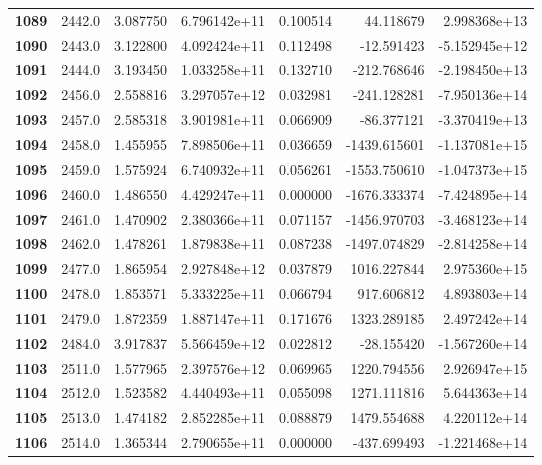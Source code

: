 \documentclass{report}[12pt]
\begin{document}
\begin{center}
\begin{tabular}{lrrrrrr}
\textbf{1089} &         2442.0 &   3.087750 &  6.796142e+11 &    0.100514 &    44.118679 &  2.998368e+13 \\
\textbf{1090} &         2443.0 &   3.122800 &  4.092424e+11 &    0.112498 &   -12.591423 & -5.152945e+12 \\
\textbf{1091} &         2444.0 &   3.193450 &  1.033258e+11 &    0.132710 &  -212.768646 & -2.198450e+13 \\
\textbf{1092} &         2456.0 &   2.558816 &  3.297057e+12 &    0.032981 &  -241.128281 & -7.950136e+14 \\
\textbf{1093} &         2457.0 &   2.585318 &  3.901981e+11 &    0.066909 &   -86.377121 & -3.370419e+13 \\
\textbf{1094} &         2458.0 &   1.455955 &  7.898506e+11 &    0.036659 & -1439.615601 & -1.137081e+15 \\
\textbf{1095} &         2459.0 &   1.575924 &  6.740932e+11 &    0.056261 & -1553.750610 & -1.047373e+15 \\
\textbf{1096} &         2460.0 &   1.486550 &  4.429247e+11 &    0.000000 & -1676.333374 & -7.424895e+14 \\
\textbf{1097} &         2461.0 &   1.470902 &  2.380366e+11 &    0.071157 & -1456.970703 & -3.468123e+14 \\
\textbf{1098} &         2462.0 &   1.478261 &  1.879838e+11 &    0.087238 & -1497.074829 & -2.814258e+14 \\
\textbf{1099} &         2477.0 &   1.865954 &  2.927848e+12 &    0.037879 &  1016.227844 &  2.975360e+15 \\
\textbf{1100} &         2478.0 &   1.853571 &  5.333225e+11 &    0.066794 &   917.606812 &  4.893803e+14 \\
\textbf{1101} &         2479.0 &   1.872359 &  1.887147e+11 &    0.171676 &  1323.289185 &  2.497242e+14 \\
\textbf{1102} &         2484.0 &   3.917837 &  5.566459e+12 &    0.022812 &   -28.155420 & -1.567260e+14 \\
\textbf{1103} &         2511.0 &   1.577965 &  2.397576e+12 &    0.069965 &  1220.794556 &  2.926947e+15 \\
\textbf{1104} &         2512.0 &   1.523582 &  4.440493e+11 &    0.055098 &  1271.111816 &  5.644363e+14 \\
\textbf{1105} &         2513.0 &   1.474182 &  2.852285e+11 &    0.088879 &  1479.554688 &  4.220112e+14 \\
\textbf{1106} &         2514.0 &   1.365344 &  2.790655e+11 &    0.000000 &  -437.699493 & -1.221468e+14 \\

\end{tabular}
\end{center}
\end{document}
